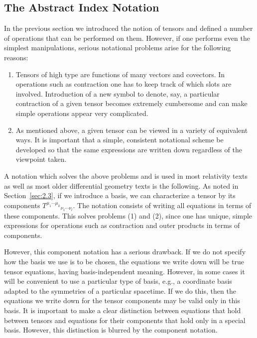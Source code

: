 
\subsection{The Abstract Index Notation}\label{sec:2.4}

In the previous section we introduced the notion of tensors and defined a number of
operations that can be performed on them.  However, if one performs even the
simplest manipulations, serious notational problems arise for the following reasons:
\begin{enumerate}[label=(\arabic*)]
  \item Tensors of high type are functions of many vectors and covectors.  In
    operations such as contraction one has to keep track of which slots are involved.
    Introduction of a new symbol to denote, say, a particular contraction of a given
    tensor becomes extremely cumbersome and can make simple operations appear very
    complicated.
  \item As mentioned above, a given tensor can be viewed in a variety of equivalent
    ways.  It is important that a simple, consistent notational scheme be developed
    so that the same expressions are written down regardless of the viewpoint taken.
\end{enumerate}

A notation which solves the above problems and is used in most relativity texts as
well as most older differential geometry texts is the following.  As noted in
Section~\ref{sec:2.3}, if we introduce a basis, we can characterize a tensor by its
components \(T^{\mu_1\cdots\mu_k}{}_{\nu_1\cdots\nu_l}\).  The notation consists
of writing all equations in terms of these components.  This solves problems (1)
and (2), since one has unique, simple expressions for operations such as contraction
and outer products in terms of components.

However, this component notation has a serious drawback.  If we do not specify how
the basis we use is to be chosen, the equations we write down will be true tensor
equations, having basis-independent meaning.  However, in some cases it will be
convenient to use a particular type of basis, e.g., a coordinate basis adapted to the
symmetries of a particular spacetime.  If we do this, then the equations we write
down for the tensor components may be valid only in this basis.  It is important to
make a clear distinction between equations that hold between tensors and equations
for their components that hold only in a special basis.  However, this distinction is
blurred by the component notation.

